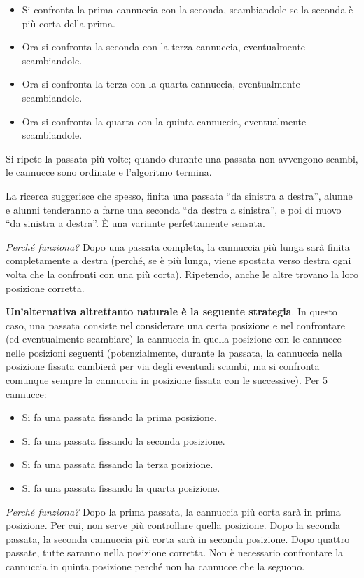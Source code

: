 \begin{itemize}
\item
  Si confronta la prima cannuccia con la seconda, scambiandole se la seconda è più corta della prima.
\item
  Ora si confronta la seconda con la terza cannuccia, eventualmente scambiandole.
\item
  Ora si confronta la terza con la quarta cannuccia, eventualmente scambiandole.
\item
  Ora si confronta la quarta con la quinta cannuccia, eventualmente scambiandole.
\end{itemize}

Si ripete la passata più volte; quando durante una passata non avvengono scambi, le cannucce sono ordinate e l'algoritmo termina.

La ricerca suggerisce che spesso, finita una passata ``da sinistra a destra'', alunne e alunni tenderanno a farne una seconda ``da destra a sinistra'', e poi di nuovo ``da sinistra a destra''. È una variante perfettamente sensata.

\textit{Perché funziona?} Dopo una passata completa, la cannuccia più lunga sarà finita completamente a destra (perché, se è più lunga, viene spostata verso destra ogni volta che la confronti con una più corta). Ripetendo, anche le altre trovano la loro posizione corretta.

\textbf{Un'alternativa altrettanto naturale è la seguente strategia}. In questo caso, una passata consiste nel considerare una certa posizione e nel confrontare (ed eventualmente scambiare) la cannuccia in quella posizione con le cannucce nelle posizioni seguenti (potenzialmente, durante la passata, la cannuccia nella posizione fissata cambierà per via degli eventuali scambi, ma si confronta comunque sempre la cannuccia in posizione fissata con le successive). Per 5 cannucce:

\begin{itemize}
\item
  Si fa una passata fissando la prima posizione.
\item
  Si fa una passata fissando la seconda posizione.
\item
  Si fa una passata fissando la terza posizione.
\item
  Si fa una passata fissando la quarta posizione.
\end{itemize}

\textit{Perché funziona?} Dopo la prima passata, la cannuccia più corta sarà in prima posizione. Per cui, non serve più controllare quella posizione. Dopo la seconda passata, la seconda cannuccia più corta sarà in seconda posizione. Dopo quattro passate, tutte saranno nella posizione corretta. Non è necessario confrontare la cannuccia in quinta posizione perché non ha cannucce che la seguono.

